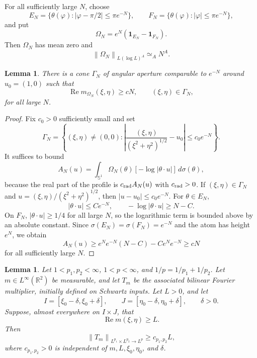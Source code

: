 \documentclass[11pt]{amsart}
\newtheorem{lemma}[definition]{Lemma}
\theoremstyle{remark}
\numberwithin{equation}{section}
\newcommand{\R}{\mathbb R}
\newcommand{\Sph}{\mathbb S^1}
\newcommand{\norm}[1]{\left\lVert #1\right\rVert}
\newcommand{\one}{\mathbf 1}
\begin{document}
	For all sufficiently large \(N\), choose
	\[
	E_N=\{\theta(\varphi):|\varphi-\pi/2|\le\pi e^{-N}\},
	\qquad
	F_N=\{\theta(\varphi):|\varphi|\le\pi e^{-N}\},
	\]
	and put
	\[
	\Omega_N=e^N(\one_{E_N}-\one_{F_N}).
	\]
	Then \(\Omega_N\) has mean zero and
	\[
	\norm{\Omega_N}_{L(\log L)^A}\simeq_A N^A.
	\]
	
	\begin{lemma}\label{lem:large-multiplier}
		There is a cone \(\Gamma_N\) of angular aperture comparable to \(e^{-N}\)
		around \(u_0=(1,0)\) such that
		\[
		\operatorname{Re}m_{\Omega_N}(\xi,\eta)\ge cN,
		\qquad
		(\xi,\eta)\in\Gamma_N,
		\]
		for all large \(N\).
	\end{lemma}
	
	\begin{proof}
		Fix \(c_0>0\) sufficiently small and set
		\[
		\Gamma_N
		=
		\left\{
		(\xi,\eta)\ne(0,0):
		\left|
		\frac{(\xi,\eta)}{(\xi^2+\eta^2)^{1/2}}-u_0
		\right|
		\le c_0e^{-N}
		\right\}.
		\]
		It suffices to bound
		\[
		A_N(u)=\int_{\Sph}\Omega_N(\theta)[-\log|\theta\cdot u|]\,d\sigma(\theta),
		\]
		because the real part of the profile is \(c_{\rm rad}A_N(u)\) with
		\(c_{\rm rad}>0\).  If \((\xi,\eta)\in\Gamma_N\) and
		\(u=(\xi,\eta)/(\xi^2+\eta^2)^{1/2}\), then \(|u-u_0|\le c_0e^{-N}\).  For
		\(\theta\in E_N\),
		\[
		|\theta\cdot u|\le C e^{-N},
		\qquad
		-\log|\theta\cdot u|\ge N-C.
		\]
		On \(F_N\), \(|\theta\cdot u|\ge1/4\) for all large \(N\), so the logarithmic
		term is bounded above by an absolute constant.  Since
		\(\sigma(E_N)=\sigma(F_N)=e^{-N}\) and the atom has height \(e^N\), we
		obtain
		\[
		A_N(u)
		\ge
		e^N e^{-N}(N-C)-Ce^N e^{-N}
		\ge cN
		\]
		for all sufficiently large \(N\).
	\end{proof}
	
	\begin{lemma}\label{lem:testing}
		Let \(1<p_1,p_2<\infty\), \(1<p<\infty\), and
		\(1/p=1/p_1+1/p_2\).  Let \(m\in L^\infty(\R^2)\) be measurable, and let
		\(T_m\) be the associated bilinear Fourier multiplier, initially defined on
		Schwartz inputs.  Let \(L>0\), and let
		\[
		I=[\xi_0-\delta,\xi_0+\delta],
		\qquad
		J=[\eta_0-\delta,\eta_0+\delta],
		\qquad
		\delta>0.
		\]
		Suppose, almost everywhere on \(I\times J\), that
		\[
		\operatorname{Re}m(\xi,\eta)\ge L.
		\]
		Then
		\[
		\norm{T_m}_{L^{p_1}\times L^{p_2}\to L^p}
		\ge
		c_{p_1,p_2}L,
		\]
		where \(c_{p_1,p_2}>0\) is independent of \(m,L,\xi_0,\eta_0\), and
		\(\delta\).
	\end{lemma}
	
\end{document}

